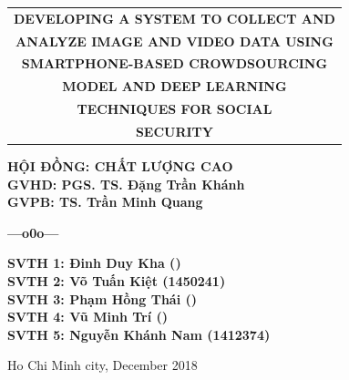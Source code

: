 \begin{titlepage}
\begin{center}
\Large
	\begin{tabular}{@{}c}
		\bfseries{DEVELOPING A SYSTEM TO COLLECT AND}\\ 
		\bfseries{ANALYZE IMAGE AND VIDEO DATA USING } \\		
		\bfseries{SMARTPHONE-BASED CROWDSOURCING} \\
		\bfseries{MODEL AND DEEP LEARNING} \\
		\bfseries{TECHNIQUES FOR SOCIAL} \\
		\bfseries{SECURITY}\\
	\end{tabular}
\end{center}
	
\hspace{4.5cm}	
\begin{minipage}[t]{0.7\linewidth}
\large
	\textbf{HỘI ĐỒNG: CHẤT LƯỢNG CAO}\\ [0.5cm]
	\textbf{GVHD: PGS. TS. Đặng Trần Khánh}\\ [0.5cm]
	\textbf{GVPB: TS. Trần Minh Quang}\\ [0.5cm]
	\vspace{-0.7cm}
	\begin{center}
	\textbf{---o0o---}
	\end{center}
	\textbf{SVTH 1: Đinh Duy Kha ()}\\ [0.5cm]
	\textbf{SVTH 2: Võ Tuấn Kiệt (1450241)}\\[0.5cm]
	\textbf{SVTH 3: Phạm Hồng Thái ()}\\[0.5cm]
	\textbf{SVTH 4: Vũ Minh Trí ()}\\[0.5cm]
	\textbf{SVTH 5: Nguyễn Khánh Nam (1412374)}\\[0.5cm]
\end{minipage}

\vfill
\centerline{\large{Ho Chi Minh city, December 2018}}
\end{titlepage}